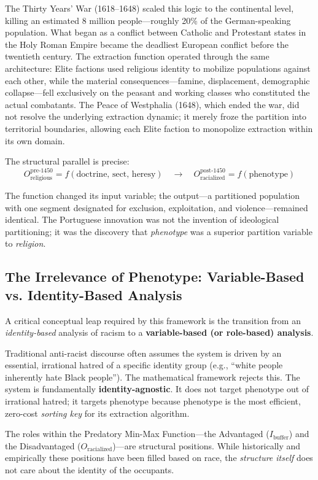 \documentclass[12pt,openany]{book}
\begin{document}
The Thirty Years' War (1618--1648) scaled this logic to the continental level, killing an estimated 8 million people---roughly 20\% of the German-speaking population. What began as a conflict between Catholic and Protestant states in the Holy Roman Empire became the deadliest European conflict before the twentieth century. The extraction function operated through the same architecture: Elite factions used religious identity to mobilize populations against each other, while the material consequences---famine, displacement, demographic collapse---fell exclusively on the peasant and working classes who constituted the actual combatants. The Peace of Westphalia (1648), which ended the war, did not resolve the underlying extraction dynamic; it merely froze the partition into territorial boundaries, allowing each Elite faction to monopolize extraction within its own domain.

The structural parallel is precise:
\[
O_{\text{religious}}^{\text{pre-1450}} = f(\text{doctrine, sect, heresy}) \quad \longrightarrow \quad O_{\text{racialized}}^{\text{post-1450}} = f(\text{phenotype})
\]

The function changed its input variable; the output---a partitioned population with one segment designated for exclusion, exploitation, and violence---remained identical. The Portuguese innovation was not the invention of ideological partitioning; it was the discovery that \textit{phenotype} was a superior partition variable to \textit{religion}.

\subsection{The Irrelevance of Phenotype: Variable-Based vs. Identity-Based Analysis}

A critical conceptual leap required by this framework is the transition from an \textit{identity-based} analysis of racism to a \textbf{variable-based (or role-based) analysis}.

Traditional anti-racist discourse often assumes the system is driven by an essential, irrational hatred of a specific identity group (e.g., ``white people inherently hate Black people''). The mathematical framework rejects this. The system is fundamentally \textbf{identity-agnostic}. It does not target phenotype out of irrational hatred; it targets phenotype because phenotype is the most efficient, zero-cost \textit{sorting key} for its extraction algorithm.

The roles within the Predatory Min-Max Function---the Advantaged ($I_{\text{buffer}}$) and the Disadvantaged ($O_{\text{racialized}}$)---are structural positions. While historically and empirically these positions have been filled based on race, the \textit{structure itself} does not care about the identity of the occupants. 
\end{document}
